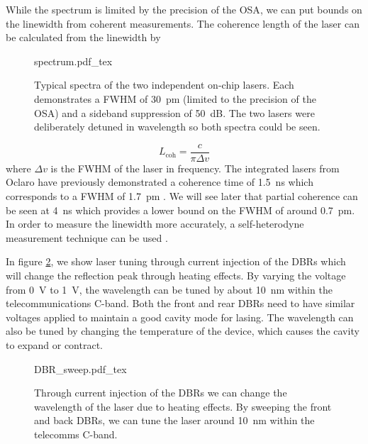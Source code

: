While the spectrum is limited by the precision of the \ac{OSA}, we can put bounds on the linewidth from coherent measurements. The coherence length of the laser can be calculated from the linewidth by

\begin{figure}[t]
	\centering
	\small
	\def\svgwidth{0.8\textwidth} 
	{spectrum.pdf_tex}
	\caption[On-chip laser spectra]{Typical spectra of the two independent on-chip lasers. Each demonstrates a \ac{FWHM} of \SI{30}{pm} (limited to the precision of the \ac{OSA}) and a sideband suppression of \SI{50}{dB}. The two lasers were deliberately detuned in wavelength so both spectra could be seen.}
	\label{fig:spectra}
\end{figure}

\begin{equation}
	L_\text{coh} = \frac{c}{\pi\Delta v}
\end{equation}
where $\Delta v$ is the \ac{FWHM} of the laser in frequency. The integrated lasers from Oclaro have previously demonstrated a coherence time of \SI{1.5}{ns} which corresponds to a \ac{FWHM} of \SI{1.7}{pm} \cite{Sibson2017InP}. We will see later that partial coherence can be seen at \SI{4}{ns} which provides a lower bound on the \ac{FWHM} of around \SI{0.7}{pm}. In order to measure the linewidth more accurately, a self-heterodyne measurement technique can be used \cite{self-heterodyne}. 

In figure \ref{fig:DBR_sweep}, we show laser tuning through current injection of the \acp{DBR} which will change the reflection peak through heating effects. By varying the voltage from \SI{0}{\V} to \SI{1}{\V}, the wavelength can be tuned by about \SI{10}{\nm} within the telecommunications C-band. Both the front and rear \acp{DBR} need to have similar voltages applied to maintain a good cavity mode for lasing. The wavelength can also be tuned by changing the temperature of the device, which causes the cavity to expand or contract. 

\begin{figure}[tp]
	\centering
	\small
	\def\svgwidth{0.9\textwidth} 
	{DBR_sweep.pdf_tex}
	\caption[Laser wavelength scan with DBR current injection]{Through current injection of the \acp{DBR} we can change the wavelength of the laser due to heating effects. By sweeping the front and back \acp{DBR}, we can tune the laser around \SI{10}{\nm} within the telecomms C-band.}
	\label{fig:DBR_sweep}
\end{figure}

